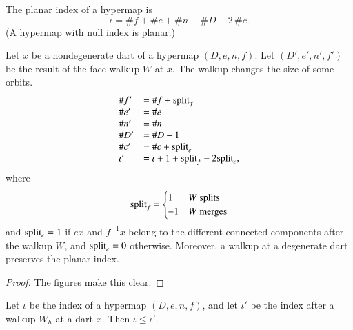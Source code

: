 \begin{definition} The planar index of a hypermap is
\begin{displaymath}\iota = \# f + \# e + \# n - \# D - 2\,\#
c.\end{displaymath}
(A hypermap with null index is planar.)
%
%
\end{definition}

\begin{lemma} 
Let $x$ be a nondegenerate dart of a hypermap $(D,e,n,f)$. Let
$(D',e',n',f')$ be the result of the face walkup $W$ at $x$.  The
walkup changes the size of some orbits.
\begin{displaymath}
\begin{array}{lll}
\# f' &=\# f +{\operatorname{split}}_f  \\  
\# e'&=\# e \\
\# n'&=\# n \\
\# D'&=\# D - 1 \\
\#c'&=\# c + {\operatorname{split}}_c\\
\iota' &= \iota + 1+{\operatorname{split}}_f - 2{\operatorname{split}}_c,\\
\end{array}
\end{displaymath}
where
\begin{displaymath}
{\operatorname{split}}_f = \begin{cases}
1 & W \text{ splits }\\
-1 & W \text{ merges}\\
\end{cases}
\end{displaymath}
and ${\operatorname{split}}_c=1$ if $e x$ and $f^{-1} x$ belong to the different
connected components after the walkup $W$, and ${\operatorname{split}}_c=0$
otherwise. Moreover, a walkup at a degenerate dart preserves the
planar index.  %
%
%
\end{lemma}

\begin{proof} The figures make this clear.
\end{proof}

\begin{lemma}
Let $\iota$ be the index of a hypermap $(D,e,n,f)$, and let $\iota'$
be the index after a walkup $W_h$ at a dart $x$.  Then $\iota \le
\iota'$.
\end{lemma} 


